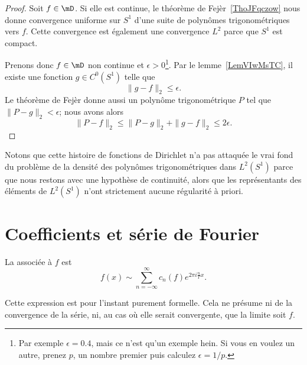 \begin{proof}
    Soit \( f\in\mD\). Si elle est continue, le théorème de Fejèr~\ref{ThoJFqczow} nous donne convergence uniforme sur \( S^1\) d'une suite de polynômes trigonométriques vers \( f\). Cette convergence est également une convergence \( L^2\) parce que \( S^1\) est compact.

    Prenons donc \( f\in \mD\) non continue et \( \epsilon>0\)\footnote{Par exemple \( \epsilon=0.4\), mais ce n'est qu'un exemple hein. Si vous en voulez un autre, prenez \( p\), un nombre premier puis calculez \( \epsilon=1/p\).}. Par le lemme~\ref{LemVIwMsTC}, il existe une fonction \( g\in C^0(S^1)\) telle que
    \begin{equation}
        \| g-f \|_2\leq \epsilon.
    \end{equation}
    Le théorème de Fejèr donne aussi un polynôme trigonométrique \( P\) tel que \( \| P-g \|_2<\epsilon\); nous avons alors
    \begin{equation}
        \| P-f \|_2\leq \| P-g \|_{2}+\| g-f \|_2\leq 2\epsilon.
    \end{equation}
\end{proof}

Notons que cette histoire de fonctions de Dirichlet n'a pas attaquée le vrai fond du problème de la densité des polynômes trigonométriques dans \(  L^2(S^1)\) parce que nous restons avec une hypothèse de continuité, alors que les représentants des éléments de \( L^2(S^1)\) n'ont strictement aucune régularité à priori.

\section{Coefficients et série de Fourier}

\begin{definition}
    La  associée à \( f\) est
    \begin{equation}
        f(x)\sim\sum_{n=-\infty}^{\infty}c_n(f) e^{2\pi i\frac{ n }{ T }x}.
    \end{equation}
\end{definition}
Cette expression est pour l'instant purement formelle. Cela ne présume ni de la convergence de la série, ni, au cas où elle serait convergente, que la limite soit \( f\).


